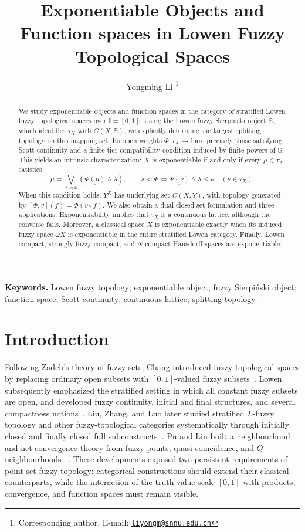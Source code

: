 \documentclass[11pt,a4paper]{article}
\title{Exponentiable Objects and Function spaces in Lowen Fuzzy Topological Spaces}
\author{Yongming Li
  \thanks{Corresponding author.
    E-mail:    \href{mailto:liyongm@snnu.edu.cn}
         {\texttt{liyongm@snnu.edu.cn}}}        }
\affil{School of Mathematics and Statistics, Shaanxi Normal University, \\ Xi’an, 710119, China}
\date{}
\numberwithin{equation}{section}
\theoremstyle{definition}
\theoremstyle{remark}
\newcommand{\I}{\mathbb I}
\newcommand{\Sier}{\mathbb S}
\newcommand{\const}[1]{\underline{#1}}
\begin{document}
\maketitle

\begin{abstract}
We study exponentiable objects and function spaces in the category of stratified Lowen fuzzy topological spaces over \(\I=[0,1]\). Using the Lowen fuzzy Sierpiński object \(\Sier\), which identifies \(\tau_X\) with \(C(X,\Sier)\), we explicitly determine the largest splitting topology on this mapping set. Its open weights \(\Phi:\tau_X\to\I\) are precisely those satisfying Scott continuity and a finite-tier compatibility condition induced by finite powers of \(\Sier\). This yields an intrinsic characterization: \(X\) is exponentiable if and only if every \(\mu\in\tau_X\) satisfies
\[
 \mu=\bigvee_{\lambda\triangleleft\Phi}
       (\const{\Phi(\mu)}\wedge\lambda),
 \qquad
 \lambda\triangleleft\Phi
 \Longleftrightarrow
 \const{\Phi(\nu)}\wedge\lambda\leq\nu
 \quad(\nu\in\tau_X).
\]
When this condition holds, \(Y^X\) has underlying set \(C(X,Y)\), with topology generated by
\([\Phi,v](f)=\Phi(v\circ f)\).
We also obtain a dual closed-set formulation and three applications. Exponentiability implies that \(\tau_X\) is a continuous lattice, although the converse fails. Moreover, a classical space \(X\) is exponentiable exactly when its induced fuzzy space \(\omega X\) is exponentiable in the entire stratified Lowen category. Finally, Lowen compact, strongly fuzzy compact, and \(N\)-compact Hausdorff spaces are exponentiable.

\end{abstract}

\noindent\textbf{Keywords.}
Lowen fuzzy topology; exponentiable object; fuzzy Sierpiński object;
function space; Scott continuity; continuous lattice; splitting topology.

\section{Introduction}

Following Zadeh's theory of fuzzy sets, Chang introduced fuzzy
topological spaces by replacing ordinary open subsets with
\([0,1]\)-valued fuzzy subsets~\cite{Chang1968-en}.  Lowen subsequently
emphasized the stratified setting in which all constant fuzzy subsets
are open, and developed fuzzy continuity, initial and final structures,
and several compactness notions~\cite{Lowen1976-en,Lowen1978-en}.
Liu, Zhang, and Luo later studied stratified \(L\)-fuzzy topology and
other fuzzy-topological categories systematically through initially
closed and finally closed full subconstructs~\cite{LiuZhangLuo2000-en}.
Pu and Liu built a neighbourhood and net-convergence theory from fuzzy
points, quasi-coincidence, and \(Q\)-neighbourhoods
~\cite{PuLiu1980-en}.  These developments exposed two persistent
requirements of point-set fuzzy topology: categorical constructions
should extend their classical counterparts, while the interaction of
the truth-value scale \([0,1]\) with products, convergence, and
function spaces must remain visible.
\end{document}
